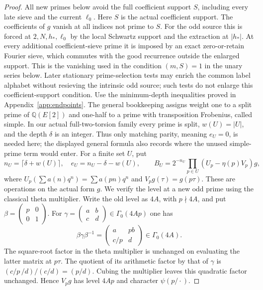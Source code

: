 \documentclass[11pt]{article}
\theoremstyle{definition}
\theoremstyle{remark}
\newcommand{\Q}{\mathbb Q}
\begin{document}
\begin{proof}\leavevmode
All new primes below avoid the full coefficient support $S$,
including every late sieve and the current $\ell_0$.
Here $S$ is the actual coefficient support.  The coefficients of
$g$ vanish at all indices not prime to $S$.
For the odd source this is forced at $2,N,h_*,\ell_0$ by the
local Schwartz support and the extraction at $|h_*|$.
At every additional coefficient-sieve prime it is imposed by an
exact zero-or-retain Fourier sieve, which commutes with the good
recurrence outside the enlarged support.  This is the vanishing
used in the condition $(m,S)=1$ in the unary series below.
Later stationary prime-selection tests may enrich the common
label alphabet without resieving the intrinsic odd source;
such tests do not enlarge this coefficient-support condition.
Use the minimum-depth inequalities proved in Appendix~\ref{app:endpoints}.
The general bookkeeping assigns weight one to a split prime of
$\Q(E[2])$ and one-half to a prime with transposition Frobenius, called
simple. In our actual full-two-torsion family every prime is split,
$w(U)=|U|$, and the depth $\delta$ is an integer. Thus only matching
parity, meaning $e_U=0$, is needed here; the displayed general formula
also records where the unused simple-prime term would enter.
For a finite set $U$, put
\[
 n_U=\lceil\delta+w(U)\rceil,\quad e_U=n_U-\delta-w(U),\qquad
 B_U=2^{-n_U}\prod_{p\in U}(U_p-\eta(p)V_p)g,
\]
where $U_p(\sum a(n)q^n)=\sum a(pn)q^n$ and $V_pg(\tau)=g(p\tau)$.
These are operations on the actual form $g$. We verify the level
at a new odd prime using the classical theta multiplier. Write the
old level as $4A$, with $p\nmid4A$, and put
$\beta=\left(\begin{smallmatrix}p&0\\0&1\end{smallmatrix}\right)$.
For $\gamma=\left(\begin{smallmatrix}a&b\\c&d\end{smallmatrix}\right)
\in\Gamma_0(4Ap)$ one has
\[
 \beta\gamma\beta^{-1}=
       \begin{pmatrix}a&pb\\c/p&d\end{pmatrix}\in\Gamma_0(4A).
\]
The square-root factor in the theta multiplier is unchanged on
evaluating the latter matrix at $p\tau$. The quotient of its
arithmetic factor by that of $\gamma$ is
$(c/p\,/d)/(c/d)=(p/d)$. Cubing the multiplier leaves this
quadratic factor unchanged. Hence $V_pg$ has level $4Ap$ and
character $\psi(p/\cdot)$.


\end{proof}
\end{document}
